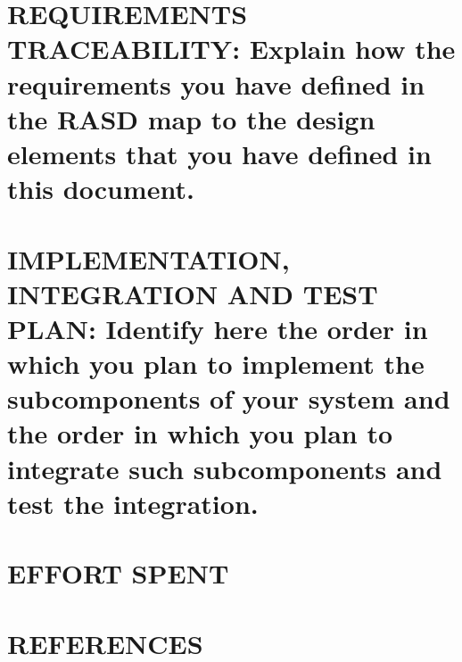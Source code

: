 \documentclass[12pt,a4paper]{article}
\begin{document}
\section{REQUIREMENTS TRACEABILITY: Explain how the requirements you have defined in the RASD map to the design elements that you have defined in this document.}
\section{IMPLEMENTATION, INTEGRATION AND TEST PLAN: Identify here the order in which you plan to implement the subcomponents of your system and the order in which you plan to integrate
such subcomponents and test the integration.}
\section{EFFORT SPENT}
\section{REFERENCES}
\end{document}
